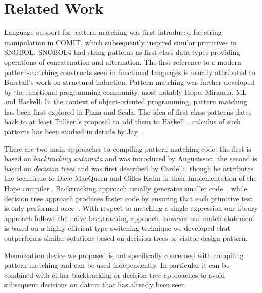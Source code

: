 \section{Related Work} %
\label{sec:rw}

Language support for pattern matching was first introduced for string manipulation 
in COMIT\cite{COMIT58}, which subsequently inspired similar primitives in 
SNOBOL\cite{SNOBOL64}. SNOBOL4 had string patterns as first-class data types 
providing operations of concatenation and alternation\cite{SNOBOL71}.
The first reference to a modern pattern-matching constructs seen in functional 
languages is usually attributed to Burstall's work on structural 
induction\cite{Burstall69provingproperties}. Pattern matching was further 
developed by the functional programming community, most notably 
Hope\cite{BMS80}, Miranda\cite{Miranda85}, ML\cite{ML90} and 
Haskell\cite{Haskell98Book}. In the context of object-oriented programming, 
pattern matching has been first explored in Pizza\cite{Odersky97pizzainto} and 
Scala\cite{Scala2nd,EmirThesis}. The idea of first class patterns dates back to 
at least Tullsen's proposal to add them to Haskell~\cite{Tullsen00}, calculus of 
such patterns has been studied in details by Jay~\cite{Jay09,PatCalc09}.

There are two main approaches to compiling pattern-matching code: the first is 
based on \emph{backtracking automata} and was introduced by Augustsson\cite{Augustsson85}, 
the second is based on \emph{decision trees} and was first described by 
Cardelli\cite{Cardelli84}, though he attributes the technique to Dave MacQueen 
and Gilles Kahn in their implementation of the Hope compiler \cite{BMS80}.
Backtracking approach usually generates smaller code~\cite{OPM01}, while decision tree 
approach produces faster code by ensuring that each primitive test is only 
performed once~\cite{Maranget08}. With respect to matching a single expression our library 
approach follows the naive backtracking approach, however our match statement is 
based on a highly efficient type switching technique we developed\cite{TypeSwitch} 
that outperforms similar solutions based on decision trees or visitor design pattern.

Memoization device we proposed is not specifically concerned with compiling 
pattern matching and can be used independently. In particular it can be combined 
with either backtracking or decision tree approaches to avoid subsequent 
decisions on datum that has already been seen.

